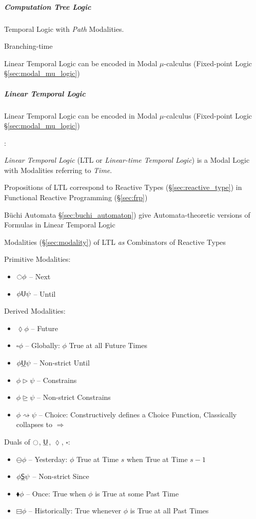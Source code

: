 \subparagraph{Computation Tree Logic}\label{sec:ctl}\hfill

Temporal Logic with \emph{Path} Modalities.

Branching-time

\fist Linear Temporal Logic can be encoded in Modal $\mu$-calculus
(Fixed-point Logic \S\ref{sec:modal_mu_logic})



\subparagraph{Linear Temporal Logic}\label{sec:linear_temporal}\hfill

\fist Linear Temporal Logic can be encoded in Modal $\mu$-calculus
(Fixed-point Logic \S\ref{sec:modal_mu_logic})

\cite{jeffrey12}:

\emph{Linear Temporal Logic} (LTL or \emph{Linear-time Temporal
  Logic}) is a Modal Logic with Modalities referring to \emph{Time}.

Propositions of LTL correspond to Reactive Types
(\S\ref{sec:reactive_type}) in Functional Reactive Programming
(\S\ref{sec:frp})

B\"uchi Automata \S\ref{sec:buchi_automaton}) give Automata-theoretic
versions of Formulas in Linear Temporal Logic

Modalities (\S\ref{sec:modality}) of LTL \emph{as} Combinators of
Reactive Types

Primitive Modalities:
\begin{itemize}
  \item $\ocircle \phi$ -- Next
  \item $\phi \mathsf{U} \psi$ -- Until
\end{itemize}

Derived Modalities:
\begin{itemize}
  \item $\lozenge \phi$ -- Future
  \item $\square \phi$ -- Globally: $\phi$ True at all Future Times
  \item $\phi \underline{\mathsf{U}} \psi$ -- Non-strict Until
  \item $\phi \rhd \psi$ -- Constrains
  \item $\phi \unrhd \psi$ -- Non-strict Constrains
  \item $\phi \rightsquigarrow \psi$ -- Choice: Constructively defines
    a Choice Function, Classically collapses to $\Rightarrow$
\end{itemize}

Duals of $\ocircle$, $\underline{\mathsf{U}}$, $\lozenge$, $\square$:
\begin{itemize}
  \item $\ominus \phi$ -- Yesterday: $\phi$ True at Time $s$ when True
    at Time $s - 1$
  \item $\phi \underline{\mathsf{S}} \psi$ -- Non-strict Since
  \item $\blacklozenge \phi$ -- Once: True when $\phi$ is True at some
    Past Time
  \item $\boxminus \phi$ -- Historically: True whenever $\phi$ is True
    at all Past Times
\end{itemize}

